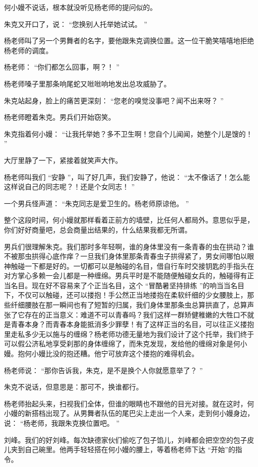 \documentclass[12pt,twoside,openany]{book}
\begin{document}
何小嫚不说话，根本就没听见杨老师的提问似的。

朱克又开口了，说： “您换别人托举她试试。 ”

杨老师叫了另一个男舞者的名字，要他跟朱克调换位置。这一位干脆笑嘻嘻地拒绝杨老师的调度。

杨老师： “你们都怎么回事，啊？！ ”

杨老师嗓子里那条响尾蛇又咝咝响地发出总攻威胁了。

朱克站起身，脸上的痛苦更深刻： “您老的嗅觉没事吧？闻不出来呀？ ”

杨老师瞪着朱克。男兵们开始窃笑。

朱克指着何小嫚： “让我托举她？多不卫生啊！您自个儿闻闻，她整个儿是馊的！ ”

大厅里静了一下，紧接着就笑声大作。

杨老师叫我们 “安静 ”，叫了好几声，我们安静了，他说： “太不像话了！怎么能这样说自己的同志呢？！还是个女同志！ ”

一个男兵怪声道： “朱克同志是爱卫生的。杨老师原谅他。 ”

整个这段时间，何小嫚就那样看着正前方的墙壁，比任何人都局外。意思似乎是，你们好好商量吧，总会商量出结果的，什么结果我都无所谓。

男兵们很理解朱克。我们那时多年轻啊，谁的身体里没有一条青春的虫在拱动？谁不被那虫拱得心底作痒？一旦我们身体里那条青春虫子拱得紧了，男女间哪怕以眼神触碰一下都是好的。一切都可以是触碰的名目，借自行车时交接钥匙的手指头在对方掌心多赖一会儿都是一种缠绵。男兵平时是不能随便触碰女兵的，触碰得有正当名目。现在好不容易来了个正当名目，这个 “冒酷暑坚持排练 ”的响当当名目下，不仅可以触碰，还可以搂抱！手公然正当地搂抱在柔软纤细的少女腰肢上，那些纤细腰肢在那一瞬间也有了短暂的归属，我们身体里那条虫总算拱直了，总算声张了它存在的正当意义：难道不可以青春吗？我们这样一群矫健稚嫩的大牲口不就是青春本身？而青春本身能抵消多少罪孽！有了这样正当的名目，可以往正义搂抱里走私多少无以施与的缠绵？杨老师功德无量地为我们设计了这个托举，我们终于可以假公济私地享受刹那的身体缠绵了，而朱克发现，发给他的缠绵对象是何小嫚。抱何小嫚比没的抱还糟。他宁可放弃这个搂抱的难得机会。

杨老师说： “那你告诉我，朱克，是不是换个人你就愿意举了？ ”

朱克不说话，但意思是：那可不，换谁都行。

杨老师抬起头来，扫视我们全体，但谁的眼睛也不跟他的目光对接。就在这时，何小嫚的新搭档出现了。从男舞者队伍的尾巴尖上走出一个人来，走到何小嫚身边，说： “杨老师，我跟朱克换位置吧。 ”

刘峰。我们的好刘峰。每次缺德家伙们偷吃了包子馅儿，刘峰都会把空空的包子皮儿夹到自己碗里。他两手轻轻搭在何小嫚的腰上，等着杨老师下达 “开始”的指令。
\end{document}
